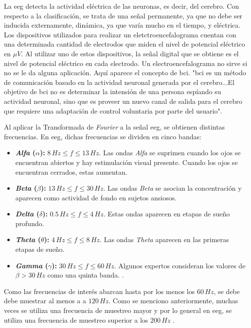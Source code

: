 La \gls{eeg} detecta la actividad eléctrica de las neuronas, es decir, del cerebro. Con respecto a la clasificación, se trata de una señal permanente, ya que no debe ser inducida externamente, dinámica, ya que varía mucho en el tiempo, y eléctrica. Los dispositivos utilizados para realizar un eletctroencefalograma cuentan con una determinada cantidad de electrodos que miden el nivel de potencial eléctrico en $ \mu V$. Al utilizar uno de estos dispositivos, la señal digital que se obtiene es el nivel de potencial eléctrico en cada electrodo. Un electroencefalograma no sirve si no se le da alguna aplicación. Aquí aparece el concepto de \gls{bci}. "\acrshort{bci} es un método de comunicación basado en la actividad neuronal generada por el cerebro...El objetivo de \acrshort{bci} no es determinar la intensión de una persona espíando su actividad neuronal, sino que es proveer un nuevo canal de salida para el cerebro que requiere una adaptación de control voluntaria por parte del usuario"\cite{neural-eng}.

Al aplicar la Transformada de \emph{Fourier} a la señal \acrshort{eeg}, se obtienen distintas frecuencias. En \acrshort{eeg}, dichas frecuencias se dividen en cinco bandas:

\begin{itemize}
 \item \textbf{\emph{Alfa} ($\alpha$):} $ 8 \, Hz \leq f \leq 13 \, Hz$. Las ondas \emph{Alfa} se suprimen cuando los ojos se encuentran abiertos y hay estimulación visual presente. Cuando los ojos se encuentran cerrados, estas aumentan.
 \item \textbf{\emph{Beta} ($\beta$):} $ 13 \, Hz \leq f \leq 30 \, Hz$. Las ondas \emph{Beta} se asocian la concentración y aparecen como actividad de fondo en sujetos ansiosos. 
 \item \textbf{\emph{Delta} ($\delta$):} $ 0.5 \, Hz \leq f \leq 4 \, Hz$. Estas ondas aparecen en etapas de sueño profundo.
 \item \textbf{\emph{Theta} ($\theta$):} $ 4 \, Hz \leq f \leq 8 \, Hz$. Las ondas \emph{Theta} aparecen en las primeras etapas de sueño.
 \item \textbf{\emph{Gamma} ($\gamma$):} $ 30 \, Hz \leq f \leq 60 \, Hz $. Algunos expertos consideran los valores de $\beta > 30 \, Hz $ como una quinta banda. \cite{neural-eng}.
\end{itemize}

Como las frecuencias de interés abarcan hasta por los menos los $60 \, Hz$, se debe debe muestrar al menos a a $120 \, Hz$. Como se menciono anteriormente, muchas veces se utiliza una frecuencia de muestreo mayor y por lo general en \acrshort{eeg}, se utiliza una frecuencia de muestreo superior a los $200 \, Hz$ \cite{neural-eng}.

